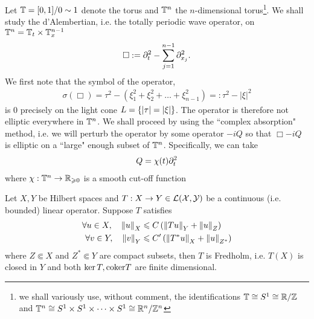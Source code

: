 \documentclass{article}
\title{}
\date{}
\begin{document}
Let $\T = [0,1] / 0 \sim 1$ denote the torus and $\T^n$ the $n$-dimensional torus\footnote{we shall variously use, without comment, the identifications $\T \cong S^1 \cong \R / \Z$ and $\T^n \cong S^1 \times S^1 \times \dots \times S^1 \cong \R^n / \Z^n$}. We shall study the d'Alembertian, i.e. the totally periodic wave operator, on $\T^n = \T_t \times \T_x^{n - 1}$ 
\begin{align}\label{eq: d'Alembertian}
\Box := \p_t^2 - \sum_{j = 1}^{n -1} \p_{x_j}^2. 
\end{align}
We first note that the symbol of the operator, 
\begin{align*}
\sigma(\Box) = \tau^2 - (\xi_1^2 + \xi_2^2 + \dots + \xi_{n -1}^2) =: \tau^2 - |\xi|^2
\end{align*}
is $0$ precisely on the light cone $L = \set{|\tau| = |\xi|}$. The operator is therefore not elliptic everywhere in $\T^n$.  We shall proceed by using the ``complex absorption" method, i.e. we will perturb the operator by some operator $-iQ$ so that $\Box - iQ$ is elliptic on a ``large" enough subset of $\T^n$. Specifically, we can take 
\begin{align}\label{eq: perturbation operator}
Q = \chi(t)\p_t^2
\end{align}
where $\chi: \T^n \to \R_{\geq 0}$ is a smooth cut-off function 



\begin{ftheorem}
Let $X, Y$ be Hilbert spaces and $T: X \to Y \in \L(X, Y)$ be a continuous (i.e. bounded) linear operator. Suppose $T$ satisfies 
\begin{align*}
\forall u \in X, \quad \norm[u]_{X} &\leq C \brac{\norm[Tu]_Y + \norm[u]_Z} \\
\forall v \in Y, \quad \norm[v]_{Y} &\leq C' \brac{\norm[T^*u]_X + \norm[u]_{Z^*}}
\end{align*}
where $Z \Subset X$ and $Z^* \Subset Y$ are compact subsets, then $T$ is Fredholm, i.e. $T(X)$ is closed in $Y$ and both $\ker T, \coker T$ are finite dimensional. 
\end{ftheorem}
\end{document}
